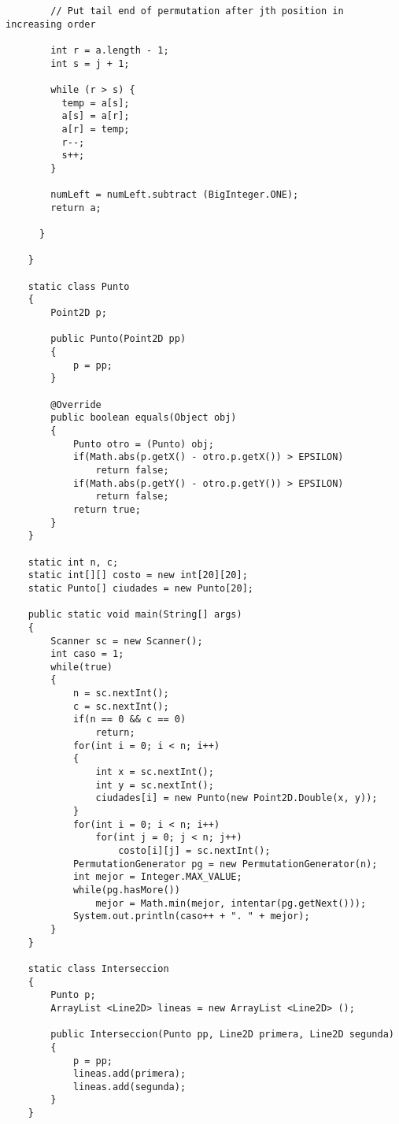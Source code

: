 \documentclass[a4paper, 11pt, oneside]{report}
\begin{document}
\begin{verbatim}
	    // Put tail end of permutation after jth position in increasing order

	    int r = a.length - 1;
	    int s = j + 1;

	    while (r > s) {
	      temp = a[s];
	      a[s] = a[r];
	      a[r] = temp;
	      r--;
	      s++;
	    }

	    numLeft = numLeft.subtract (BigInteger.ONE);
	    return a;

	  }

	}
	
	static class Punto
	{
		Point2D p;
		
		public Punto(Point2D pp) 
		{
			p = pp;
		}

		@Override
		public boolean equals(Object obj) 
		{
			Punto otro = (Punto) obj;
			if(Math.abs(p.getX() - otro.p.getX()) > EPSILON)
				return false;
			if(Math.abs(p.getY() - otro.p.getY()) > EPSILON)
				return false;
			return true;
		}
	}
	
	static int n, c;
	static int[][] costo = new int[20][20];
	static Punto[] ciudades = new Punto[20];
	
	public static void main(String[] args)
	{
		Scanner sc = new Scanner();
		int caso = 1;
		while(true)
		{
			n = sc.nextInt();
			c = sc.nextInt();
			if(n == 0 && c == 0)
				return;
			for(int i = 0; i < n; i++)
			{
				int x = sc.nextInt();
				int y = sc.nextInt();
				ciudades[i] = new Punto(new Point2D.Double(x, y));
			}
			for(int i = 0; i < n; i++)
				for(int j = 0; j < n; j++)
					costo[i][j] = sc.nextInt();
			PermutationGenerator pg = new PermutationGenerator(n);
			int mejor = Integer.MAX_VALUE;
			while(pg.hasMore())
				mejor = Math.min(mejor, intentar(pg.getNext()));
			System.out.println(caso++ + ". " + mejor);
		}
	}

	static class Interseccion
	{
		Punto p;
		ArrayList <Line2D> lineas = new ArrayList <Line2D> ();
		
		public Interseccion(Punto pp, Line2D primera, Line2D segunda)
		{
			p = pp;
			lineas.add(primera);
			lineas.add(segunda);
		}
	}
	

\end{verbatim}
\end{document}
